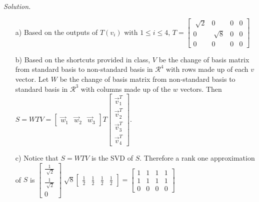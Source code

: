 \documentclass[12pt,pdftex]{article}
\begin{document}
\textit{Solution.}
\begin{itemize}
\item[a)] Based on the outputs of $T(v_i)$ with $1\leq i \leq 4$, $T=\begin{bmatrix}
			\sqrt[]{2} & 0 & 0 & 0 \\
            0 & \sqrt[]{8} & 0 & 0 \\
            0 & 0 & 0 & 0
			\end{bmatrix}$
\item[b)] Based on the shortcuts provided in class, $V$ be the change of basis matrix from standard basis to non-standard basis in $\mathcal{R}^4$ with rows made up of each $v$ vector. Let $W$ be the change of basis matrix from non-standard basis to standard basis in $\mathcal{R}^3$ with columns made up of the $w$ vectors. 
Then $S=WTV=\begin{bmatrix}
\vec{w}_1 & \vec{w}_2 & \vec{w}_3
\end{bmatrix}
T
\begin{bmatrix}
\vec{v}_1^T \\ \vec{v}_2^T \\ \vec{v}_3^T \\ \vec{v}_4^T
\end{bmatrix}$.
\item[c)] Notice that $S=WTV$ is the SVD of $S$. Therefore a rank one approximation of $S$ is 
$\begin{bmatrix}
\frac{1}{\sqrt[]{2}} \\ \frac{1}{\sqrt[]{2}} \\ 0
\end{bmatrix}
\sqrt[]{8}
\begin{bmatrix}
\frac{1}{2} & \frac{1}{2} & \frac{1}{2} & \frac{1}{2}
\end{bmatrix}=\begin{bmatrix}
1 & 1 & 1 & 1 \\
1 & 1 & 1 & 1 \\
0 & 0 & 0 & 0
\end{bmatrix}$
\end{itemize}
\end{document}
